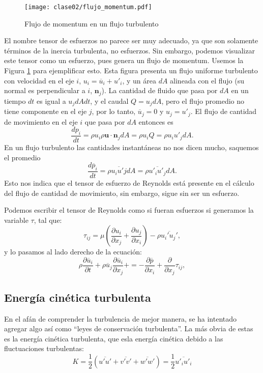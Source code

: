 \begin{figure}[h!]
\centering
\texttt{[image: clase02/flujo\_momentum.pdf]}
\caption{Flujo de momentum en un flujo turbulento}
\label{fig:flujo_momentum}
\end{figure}
%
El nombre tensor de esfuerzos no parece ser muy adecuado, ya que son solamente términos de la inercia turbulenta, no esfuerzos.
Sin embargo, podemos visualizar este tensor como un esfuerzo, pues genera un flujo de momentum.
Usemos la Figura \ref{fig:flujo_momentum} para ejemplificar esto.
Esta figura presenta un flujo uniforme turbulento con velocidad en el eje $i$, $u_i = \overline{u}_i + u'_i$, y un área $dA$ alineada con el flujo (su normal es perpendicular a $i$, $\mathbf{n}_j$).
La cantidad de fluido que pasa por $dA$ en un tiempo $dt$ es igual a $u_jdAdt$, y el caudal $Q=u_jdA$, pero el flujo promedio no tiene componente en el eje $j$, por lo tanto, $\overline{u}_j=0$ y $u_j = u'_j$.
El flujo de cantidad de movimiento en el eje $i$ que pasa por $dA$ entonces es 
%
\begin{equation}
\frac{dp_i}{dt} = \rho u_i \rho \mathbf{u}\cdot\mathbf{n}_j dA = \rho u_i Q = \rho u_i u'_j dA.
\end{equation}
%
En un flujo turbulento las cantidades instantáneas no nos dicen mucho, saquemos el promedio
%
\begin{equation}
\frac{d\overline{p}_i}{dt} = \rho \overline{u_i u'j} dA = \rho \overline{u'_iu'_j}dA.
\end{equation}
%
Esto nos indica que el tensor de esfuerzo de Reynolds está presente en el cálculo del flujo de cantidad de movimiento, sin embargo, sigue sin ser un esfuerzo.

Podemos escribir el tensor de Reynolds como si fueran esfuerzos si generamos la variable $\tau$, tal que:
%
\begin{equation}
\tau_{ij} = \mu\left(\frac{\partial u_i}{\partial x_j} + \frac{\partial u_j}{\partial x_i}\right) - \rho \overline{u_i'u_j'},
\end{equation}
%
y lo pasamos al lado derecho de la ecuación:
%
\begin{equation}\label{eq:tensor}
\rho\frac{\partial \overline{u}_i}{\partial t} + \rho\overline{u}_j\frac{\partial \overline{u}_i}{\partial x_j} +  = -\frac{\partial \overline{p}}{\partial x_i} + \frac{\partial}{\partial x_j}\tau_{ij},
\end{equation}



\subsection*{Energía cinética turbulenta}
En el afán de comprender la turbulencia de mejor manera, se ha intentado agregar algo así como ``leyes de conservación turbulenta''.
La más obvia de estas es la energía cinética turbulenta, que esla energía cinética debido a las fluctuaciones turbulentas:
%
\begin{equation}
K = \frac{1}{2}\left( \overline{u'u'}+\overline{v'v'}+\overline{w'w'}\right)=\frac{1}{2}\overline{u'_iu'_i}
\end{equation}

